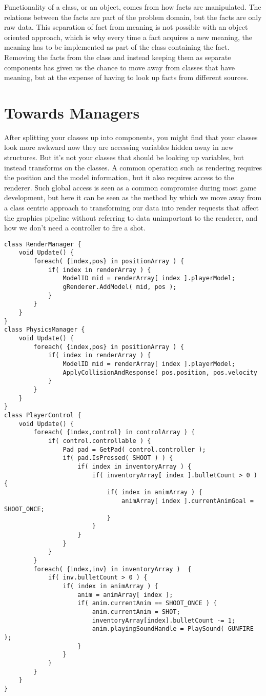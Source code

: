 Functionality of a class, or an object, comes from how facts are manipulated.
The relations between the facts are part of the problem domain, but the facts
are only raw data. This separation of fact from meaning is not possible with an
object oriented approach, which is why every time a fact acquires a new
meaning, the meaning has to be implemented as part of the class containing the
fact. Removing the facts from the class and instead keeping them as separate
components has given us the chance to move away from classes that have meaning,
but at the expense of having to look up facts from different sources.

\section{Towards Managers}

After splitting your classes up into components, you might find that your
classes look more awkward now they are accessing variables hidden away in new
structures. But it's not your classes that should be looking up variables, but
instead transforms on the classes. A common operation such as rendering
requires the position and the model information, but it also requires access to
the renderer. Such global access is seen as a common compromise during most
game development, but here it can be seen as the method by which we move away
from a class centric approach to transforming our data into render requests
that affect the graphics pipeline without referring to data unimportant to the
renderer, and how we don't need a controller to fire a shot.

\begin{lstlisting}
class RenderManager {
	void Update() {
		foreach( {index,pos} in positionArray ) {
			if( index in renderArray ) {
				ModelID mid = renderArray[ index ].playerModel;
				gRenderer.AddModel( mid, pos );
			}
		}
	}
}
class PhysicsManager {
	void Update() {
		foreach( {index,pos} in positionArray ) {
			if( index in renderArray ) {
				ModelID mid = renderArray[ index ].playerModel;
				ApplyCollisionAndResponse( pos.position, pos.velocity
			}
		}
	}
}
class PlayerControl {
	void Update() {
		foreach( {index,control} in controlArray ) {
			if( control.controllable ) {
				Pad pad = GetPad( control.controller );
				if( pad.IsPressed( SHOOT ) ) {
					if( index in inventoryArray ) {
						if( inventoryArray[ index ].bulletCount > 0 ) {
							if( index in animArray ) {
								animArray[ index ].currentAnimGoal = SHOOT_ONCE;
							}
						}
					}
				}
			}
		}
		foreach( {index,inv} in inventoryArray )  {
			if( inv.bulletCount > 0 ) {
				if( index in animArray ) {
					anim = animArray[ index ];
					if( anim.currentAnim == SHOOT_ONCE ) {
						anim.currentAnim = SHOT;
						inventoryArray[index].bulletCount -= 1;
						anim.playingSoundHandle = PlaySound( GUNFIRE );
					}
				}
			}
		}
	}
}
\end{lstlisting}


